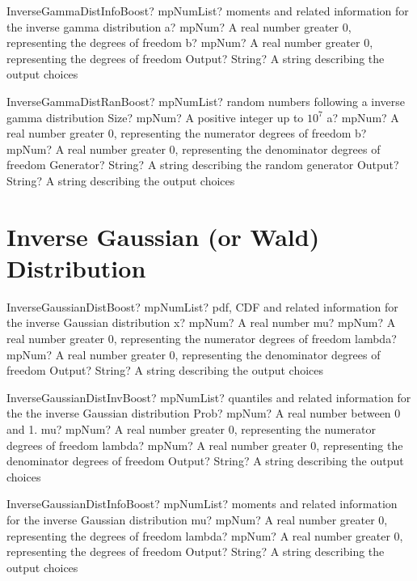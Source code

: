 \documentclass[12pt,a4paper,openany]{book}
\begin{document}
\begin{mpFunctionsExtract}
\mpFunctionThreeNotImplemented
{InverseGammaDistInfoBoost? mpNumList? moments and related information for the inverse gamma distribution}
{a? mpNum? A real number greater 0, representing the degrees of freedom}
{b? mpNum? A real number greater 0, representing the degrees of freedom}
{Output? String? A string describing the output choices}
\end{mpFunctionsExtract}

\begin{mpFunctionsExtract}
\mpFunctionFiveNotImplemented
{InverseGammaDistRanBoost? mpNumList? random numbers following a inverse gamma distribution}
{Size? mpNum? A positive integer up to $10^7$}
{a? mpNum? A real number greater 0, representing the numerator  degrees of freedom}
{b? mpNum? A real number greater 0, representing the denominator degrees of freedom}
{Generator? String? A string describing the random generator}
{Output? String? A string describing the output choices}
\end{mpFunctionsExtract}

\section{Inverse Gaussian (or Wald) Distribution}

\begin{mpFunctionsExtract}
\mpFunctionFourNotImplemented
{InverseGaussianDistBoost? mpNumList? pdf, CDF and related information for the inverse Gaussian distribution}
{x? mpNum? A real number}
{mu? mpNum? A real number greater 0, representing the numerator  degrees of freedom}
{lambda? mpNum? A real number greater 0, representing the denominator degrees of freedom}
{Output? String? A string describing the output choices}
\end{mpFunctionsExtract}

\begin{mpFunctionsExtract}
\mpFunctionFourNotImplemented
{InverseGaussianDistInvBoost? mpNumList? quantiles and related information for the the inverse Gaussian distribution}
{Prob? mpNum? A real number between 0 and 1.}
{mu? mpNum? A real number greater 0, representing the numerator  degrees of freedom}
{lambda? mpNum? A real number greater 0, representing the denominator degrees of freedom}
{Output? String? A string describing the output choices}
\end{mpFunctionsExtract}

\begin{mpFunctionsExtract}
\mpFunctionThreeNotImplemented
{InverseGaussianDistInfoBoost? mpNumList? moments and related information for the inverse Gaussian distribution}
{mu? mpNum? A real number greater 0, representing the degrees of freedom}
{lambda? mpNum? A real number greater 0, representing the degrees of freedom}
{Output? String? A string describing the output choices}
\end{mpFunctionsExtract}
\end{document}
